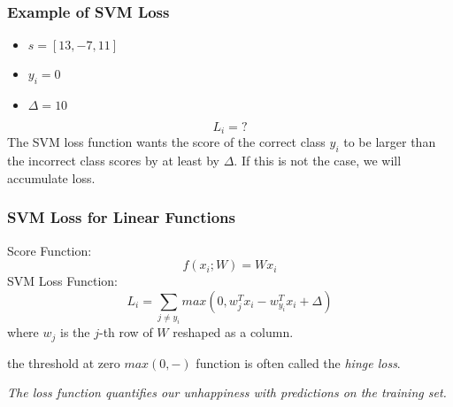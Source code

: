 \documentclass[14 pt]{beamer}
\let\olditem\item
\renewcommand{\item}{\olditem\vspace{4pt}}
\begin{document}
\begin{frame}
  \frametitle{Example of SVM Loss}
  \begin{itemize}
  \item $s=[13, -7, 11]$
  \item $y_i=0$
  \item $\Delta=10$
  \end{itemize}
  \begin{displaymath}
    L_i = ?
  \end{displaymath}
  The SVM loss function wants the score of the correct class $y_i$ to be
  larger than the incorrect class scores by at least by $\Delta$. If this
  is not the case, we will accumulate loss.
\end{frame}

\begin{frame}
  \frametitle{SVM Loss for Linear  Functions}
Score Function:
  \begin{displaymath}
    f(x_i; W) = Wx_i
  \end{displaymath}
SVM Loss Function:
  \begin{displaymath}
         L_i = \sum_{j\neq y_i}max(0, w_j^Tx_i-w_{y_i}^Tx_i+\Delta)
  \end{displaymath}
where $w_j$ is the $j$-th row of $W$ reshaped as a column.

the threshold at zero $max(0,-)$ function is often called the \emph{hinge
  loss}.
\end{frame}
\begin{frame}
  \begin{centering}
    \emph{The loss function quantifies our unhappiness with predictions on
      the training set.}
  \end{centering}
 \end{frame}
\end{document}
